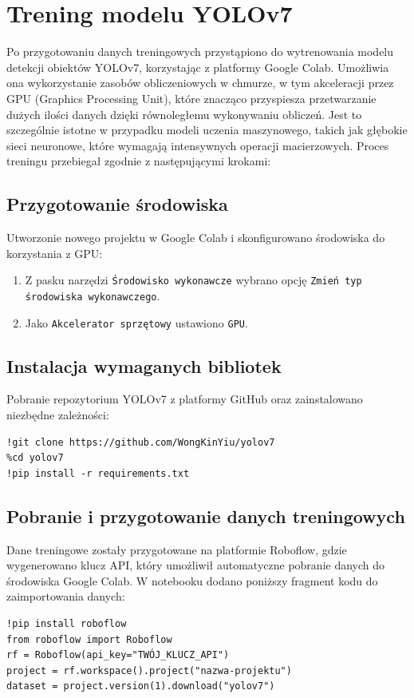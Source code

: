 \documentclass[a4paper,twoside,12pt]{book}
\begin{document}
\newpage

\section{Trening modelu YOLOv7}

Po przygotowaniu danych treningowych przystąpiono do wytrenowania modelu detekcji obiektów YOLOv7, korzystając z platformy Google Colab. Umożliwia ona wykorzystanie zasobów obliczeniowych w chmurze, w tym akceleracji przez GPU (Graphics Processing Unit), które znacząco przyspiesza przetwarzanie dużych ilości danych dzięki równoległemu wykonywaniu obliczeń. Jest to szczególnie istotne w przypadku modeli uczenia maszynowego, takich jak głębokie sieci neuronowe, które wymagają intensywnych operacji macierzowych. Proces treningu przebiegał zgodnie z następującymi krokami:

\subsection{Przygotowanie środowiska}
Utworzonie nowego projektu w Google Colab i skonfigurowano środowiska do korzystania z GPU:
\begin{enumerate}
    \item Z pasku narzędzi \texttt{Środowisko wykonawcze} wybrano opcję \texttt{Zmień typ środowiska wykonawczego}.
    \item Jako \texttt{Akcelerator sprzętowy} ustawiono \texttt{GPU}.
\end{enumerate}

\subsection{Instalacja wymaganych bibliotek}
Pobranie repozytorium YOLOv7 z platformy GitHub oraz zainstalowano niezbędne zależności:
\begin{verbatim}
!git clone https://github.com/WongKinYiu/yolov7
%cd yolov7
!pip install -r requirements.txt
\end{verbatim}

\subsection{Pobranie i przygotowanie danych treningowych}
Dane treningowe zostały przygotowane na platformie Roboflow, gdzie wygenerowano klucz API, który umożliwił automatyczne pobranie danych do środowiska Google Colab. W notebooku dodano poniższy fragment kodu do zaimportowania danych:
\begin{verbatim}
!pip install roboflow
from roboflow import Roboflow
rf = Roboflow(api_key="TWÓJ_KLUCZ_API")
project = rf.workspace().project("nazwa-projektu")
dataset = project.version(1).download("yolov7")
\end{verbatim}
\end{document}
